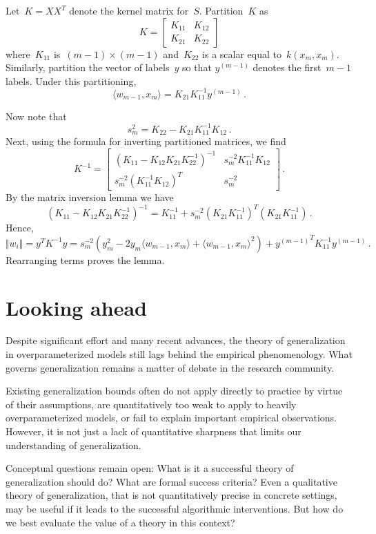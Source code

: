 \documentclass{tufte-book}
\begin{document}
Let~\(K= XX^T\) denote the kernel matrix for~\(S\). Partition~\(K\) as
\[
    K = \begin{bmatrix} K_{11} & K_{12} \\ K_{21} & K_{22} \end{bmatrix}
\] where~\(K_{11}\) is~\((m-1) \times (m-1)\) and~\(K_{22}\) is a scalar
equal to~\(k(x_m,x_m)\). Similarly, partition the vector of labels~\(y\)
so that \(y^{(m-1)}\) denotes the first~\(m-1\) labels. Under this
partitioning, \[
 \langle w_{m-1} , x_m \rangle = K_{21} K_{11}^{-1} y^{(m-1)}\,.
\]

Now note that \[
s_m^2 = K_{22}-K_{21} K_{11}^{-1} K_{12}\,.
\] Next, using the formula for inverting partitioned matrices, we find
\[
    K^{-1} = \begin{bmatrix}
    (K_{11}-K_{12}K_{21}K_{22}^{-1})^{-1} & s_m^{-2} K_{11}^{-1} K_{12} \\
    s_m^{-2} (K_{11}^{-1} K_{12})^T & s_m^{-2}
    \end{bmatrix}\,.
\] By the matrix inversion lemma we have \[
    (K_{11}-K_{12}K_{21}K_{22}^{-1})^{-1}
    = K_{11}^{-1} +s_m^{-2} \left(K_{21} K_{11}^{-1}\right)^T\left(K_{21} K_{11}^{-1}\right) \,.
\] Hence, \[
    \Vert w_{i}\Vert = y^T K^{-1} y = s_m^{-2}(y_m^2 - 2y_m \langle w_{m-1} ,x_m\rangle +\langle w_{m-1} ,x_m\rangle^2 ) + {y^{(m-1)}}^T K_{11}^{-1} y^{(m-1)}\,.
\] Rearranging terms proves the lemma.

\hypertarget{looking-ahead}{%
\section{Looking ahead}\label{looking-ahead}}

Despite significant effort and many recent advances, the theory of
generalization in overparameterized models still lags behind the
empirical phenomenology. What governs generalization remains a matter of
debate in the research community.

Existing generalization bounds often do not apply directly to practice
by virtue of their assumptions, are quantitatively too weak to apply to
heavily overparameterized models, or fail to explain important empirical
observations. However, it is not just a lack of quantitative sharpness
that limits our understanding of generalization.

Conceptual questions remain open: What is it a successful theory of
generalization should do? What are formal success criteria? Even a
qualitative theory of generalization, that is not quantitatively precise
in concrete settings, may be useful if it leads to the successful
algorithmic interventions. But how do we best evaluate the value of a
theory in this context?
\end{document}
